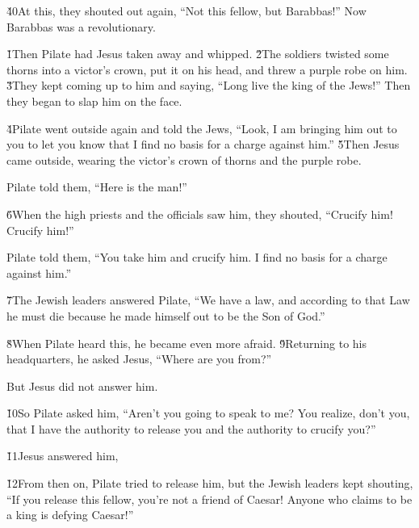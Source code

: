 \v{40}At this, they shouted out again, ``Not this fellow, but Barabbas!'' Now Barabbas was a revolutionary.

\v{1}Then Pilate had Jesus taken away and whipped. \v{2}The soldiers twisted some thorns into a victor's crown, put it on his head, and threw a purple robe on him. \v{3}They kept coming up to him and saying, ``Long live the king of the Jews!'' Then they began to slap him on the face.

\v{4}Pilate went outside again and told the Jews, ``Look, I am bringing him out to you to let you know that I find no basis for a charge against him.'' \v{5}Then Jesus came outside, wearing the victor's crown of thorns and the purple robe.

Pilate told them, ``Here is the man!''

\v{6}When the high priests and the officials saw him, they shouted, ``Crucify him! Crucify him!''

Pilate told them, ``You take him and crucify him. I find no basis for a charge against him.''

\v{7}The Jewish leaders answered Pilate, ``We have a law, and according to that Law he must die because he made himself out to be the Son of God.''

\v{8}When Pilate heard this, he became even more afraid. \v{9}Returning to his headquarters, he asked Jesus, ``Where are you from?''

But Jesus did not answer him.

\v{10}So Pilate asked him, ``Aren't you going to speak to me? You realize, don't you, that I have the authority to release you and the authority to crucify you?''

\v{11}Jesus answered him, 

\v{12}From then on, Pilate tried to release him, but the Jewish leaders kept shouting, ``If you release this fellow, you're not a friend of Caesar! Anyone who claims to be a king is defying Caesar!''

